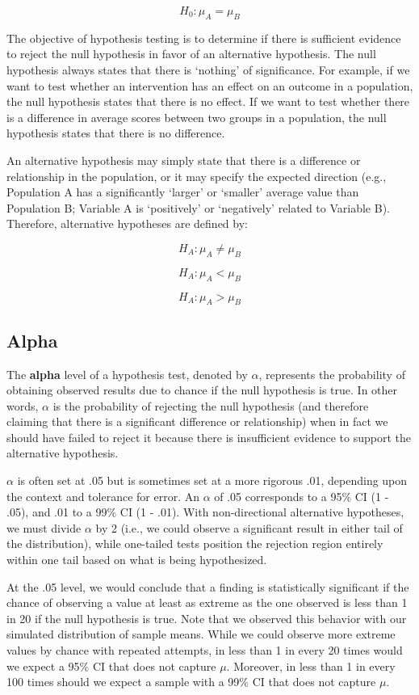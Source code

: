 \documentclass[]{book}
\begin{document}
\[ H_0: \mu_A = \mu_B \]

The objective of hypothesis testing is to determine if there is sufficient evidence to reject the null hypothesis in favor of an alternative hypothesis. The null hypothesis always states that there is `nothing' of significance. For example, if we want to test whether an intervention has an effect on an outcome in a population, the null hypothesis states that there is no effect. If we want to test whether there is a difference in average scores between two groups in a population, the null hypothesis states that there is no difference.

An alternative hypothesis may simply state that there is a difference or relationship in the population, or it may specify the expected direction (e.g., Population A has a significantly `larger' or `smaller' average value than Population B; Variable A is `positively' or `negatively' related to Variable B). Therefore, alternative hypotheses are defined by:

\[ H_A: \mu_A \neq \mu_B \]

\[ H_A: \mu_A < \mu_B \]

\[ H_A: \mu_A > \mu_B \]

\hypertarget{alpha}{%
\subsection{Alpha}\label{alpha}}

The \textbf{alpha} level of a hypothesis test, denoted by \(\alpha\), represents the probability of obtaining observed results due to chance if the null hypothesis is true. In other words, \(\alpha\) is the probability of rejecting the null hypothesis (and therefore claiming that there is a significant difference or relationship) when in fact we should have failed to reject it because there is insufficient evidence to support the alternative hypothesis.

\(\alpha\) is often set at .05 but is sometimes set at a more rigorous .01, depending upon the context and tolerance for error. An \(\alpha\) of .05 corresponds to a 95\% CI (1 - .05), and .01 to a 99\% CI (1 - .01). With non-directional alternative hypotheses, we must divide \(\alpha\) by 2 (i.e., we could observe a significant result in either tail of the distribution), while one-tailed tests position the rejection region entirely within one tail based on what is being hypothesized.

At the .05 level, we would conclude that a finding is statistically significant if the chance of observing a value at least as extreme as the one observed is less than 1 in 20 if the null hypothesis is true. Note that we observed this behavior with our simulated distribution of sample means. While we could observe more extreme values by chance with repeated attempts, in less than 1 in every 20 times would we expect a 95\% CI that does not capture \(\mu\). Moreover, in less than 1 in every 100 times should we expect a sample with a 99\% CI that does not capture \(\mu\).
\end{document}
